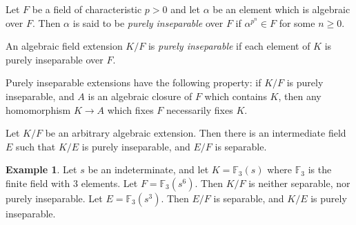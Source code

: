 \documentclass[12pt]{article}
\theoremstyle{definition}
\newtheorem*{example}{Example}
\newcommand{\F}{\mathbb{F}}
\begin{document}
Let $F$ be a field of characteristic $p > 0$ and let $\alpha$ be an element which is algebraic over $F$.  Then $\alpha$ is said to be \emph{purely inseparable} over $F$ if $\alpha^{p^n} \in F$ for some $n \ge 0$.

An algebraic field extension $K/F$ is \emph{purely inseparable} if each element of $K$ is purely inseparable over $F$.

Purely inseparable extensions have the following property: if $K/F$ is purely inseparable, and $A$ is an algebraic closure of $F$ which contains $K$, then any homomorphism $K \to A$ which fixes $F$ necessarily fixes $K$.

Let $K/F$ be an arbitrary algebraic extension.  Then there is an intermediate field $E$ such that $K/E$ is purely inseparable, and $E/F$ is separable.


\begin{example}
Let $s$ be an indeterminate, and let $K = \F_3(s)$ where $\F_3$ is the finite field with $3$ elements.  Let $F = \F_3(s^6)$.  Then $K/F$ is neither separable, nor purely inseparable.  Let $E = \F_3(s^3)$.  Then $E/F$ is separable, and $K/E$ is purely inseparable.
\end{example}
\end{document}

